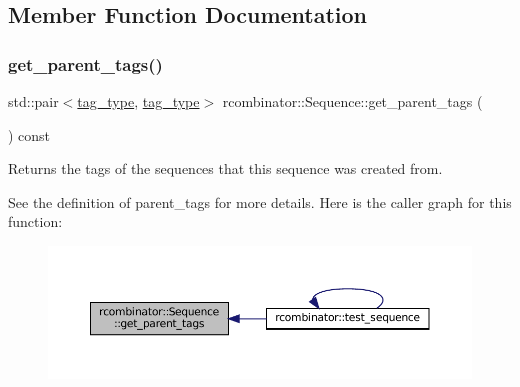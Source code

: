 \subsection{Member Function Documentation}
\mbox{\label{classrcombinator_1_1Sequence_ac2b82b11141c68a065d05c02c6ea3a58}} 
\subsubsection{\texorpdfstring{get\+\_\+parent\+\_\+tags()}{get\_parent\_tags()}}
{\footnotesize\ttfamily std\+::pair$<$\mbox{\hyperlink{constants_8h_a3e6daf1646e952257330d8cfe20e96f8}{tag\+\_\+type}}, \mbox{\hyperlink{constants_8h_a3e6daf1646e952257330d8cfe20e96f8}{tag\+\_\+type}}$>$ rcombinator\+::\+Sequence\+::get\+\_\+parent\+\_\+tags (\begin{DoxyParamCaption}{ }\end{DoxyParamCaption}) const\hspace{0.3cm}{\ttfamily [inline]}}



Returns the tags of the sequences that this sequence was created from. 

See the definition of parent\+\_\+tags for more details. Here is the caller graph for this function\+:
\nopagebreak
\begin{figure}[H]
\begin{center}
\leavevmode
\includegraphics[width=350pt]{classrcombinator_1_1Sequence_ac2b82b11141c68a065d05c02c6ea3a58_icgraph}
\end{center}
\end{figure}
\mbox{\label{classrcombinator_1_1Sequence_a5af66ddd3c8bc05307b56737c56060bf}} 
